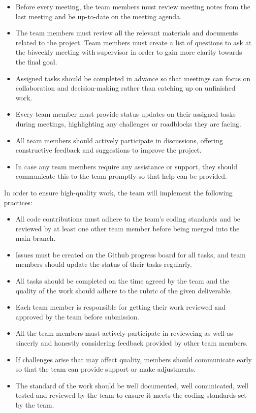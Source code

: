 \documentclass{article}
\begin{document}
\begin{itemize}
  \item Before every meeting, the team members must review meeting notes from the last meeting and be up-to-date on the meeting agenda.
  \item The team members must review all the relevant materials and documents related to the project. Team members must create a list of questions to ask at the biweekly meeting with supervisor in order to gain more clarity towards the final goal.
  \item Assigned tasks should be completed in advance so that meetings can focus on collaboration and decision-making rather than catching up on unfinished work.
  \item Every team member must provide status updates on their assigned tasks during meetings, highlighting any challenges or roadblocks they are facing.
  \item All team members should actively participate in discussions, offering constructive feedback and suggestions to improve the project.
  \item In case any team members require any assistance or support, they should communicate this to the team promptly so that help can be provided.
\end{itemize}

\noindent In order to ensure high-quality work, the team will implement the following practices:

\begin{itemize}
  \item All code contributions must adhere to the team's coding standards and be reviewed by at least one other team member before being merged 
  into the main branch.
  \item Issues must be created on the Github progress board for all tasks, and team members should update the status of their tasks regularly.
  \item All tasks should be completed on the time agreed by the team and the quality of the work should adhere to the rubric of the given deliverable.
  \item Each team member is responsible for getting their work reviewed and approved by the team before submission.
  \item All the team members must actively participate in revieweing as well as sincerly and honestly considering feedback provided by other team members.
  \item If challenges arise that may affect quality, members should communicate early so that the team can provide support or make adjustments.
  \item The standard of the work should be well documented, well comunicated, well tested and reviewed by the team to ensure it meets the coding standards set by the team.
\end{itemize}
\end{document}
